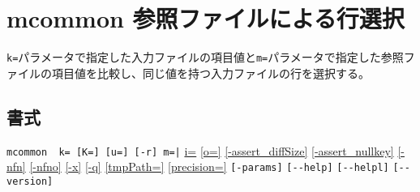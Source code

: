 
%

\section{mcommon 参照ファイルによる行選択\label{sect:mcommon}}
\verb|k=|パラメータで指定した入力ファイルの項目値と\verb|m=|パラメータで指定した参照ファイルの項目値を比較し、同じ値を持つ入力ファイルの行を選択する。

\subsection*{書式}
\verb/mcommon  k= [K=] [u=] [-r] m=|/
\hyperref[sect:option_i]{i=}
\hyperref[sect:option_o]{[o=]}
\hyperref[sect:option_assert_diffSize]{[-assert\_diffSize]}
\hyperref[sect:option_assert_nullkey]{[-assert\_nullkey]}
\hyperref[sect:option_nfn]{[-nfn]} 
\hyperref[sect:option_nfno]{[-nfno]}  
\hyperref[sect:option_x]{[-x]}
\hyperref[sect:option_q]{[-q]}
\hyperref[sect:option_option_tmppath]{[tmpPath=]}
\hyperref[sect:option_precision]{[precision=]}
\verb|[-params]|
\verb|[--help]|
\verb|[--helpl]|
\verb|[--version]|\\

